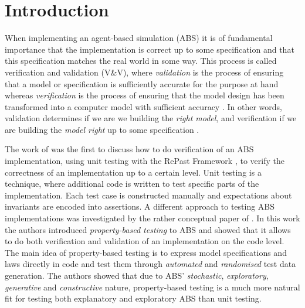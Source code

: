 \section{Introduction}
\label{sec:introduction}
When implementing an agent-based simulation (ABS) it is of fundamental importance that the implementation is correct up to some specification and that this specification matches the real world in some way. This process is called verification and validation (V\&V), where \textit{validation} is the process of ensuring that a model or specification is sufficiently accurate for the purpose at hand whereas \textit{verification} is the process of ensuring that the model design has been transformed into a computer model with sufficient accuracy \cite{robinson_simulation:_2014}. In other words, validation determines if we are we building the \textit{right model}, and verification if we are building the \textit{model right} up to some specification \cite{balci_verification_1998}.

The work of \cite{collier_test-driven_2013} was the first to discuss how to do verification of an ABS implementation, using unit testing with the RePast Framework \cite{north_complex_2013}, to verify the correctness of an implementation up to a certain level. Unit testing is a technique, where additional code is written to test specific parts of the implementation. Each test case is constructed manually and expectations about invariants are encoded into assertions. A different approach to testing ABS implementations was investigated by the rather conceptual paper of \cite{thaler_show_2019}. In this work the authors introduced \textit{property-based testing} to ABS and showed that it allows to do both verification and validation of an implementation on the code level. The main idea of property-based testing is to express model specifications and laws directly in code and test them through \textit{automated} and \textit{randomised} test data generation. The authors showed that due to ABS' \textit{stochastic}, \textit{exploratory}, \textit{generative} and \textit{constructive} nature, property-based testing is a much more natural fit for testing both explanatory and exploratory ABS than unit testing. 

